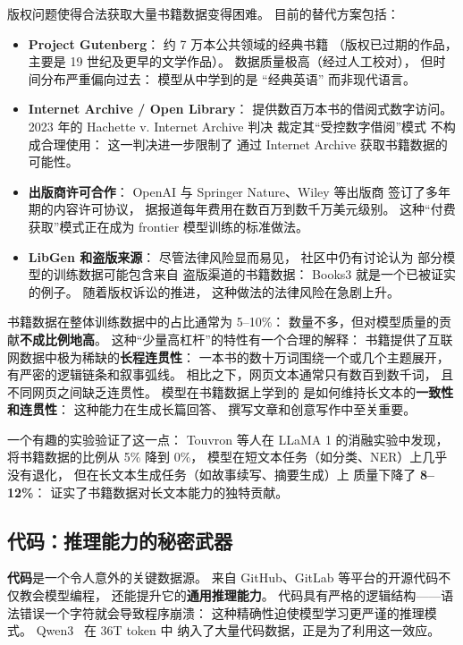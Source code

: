 版权问题使得合法获取大量书籍数据变得困难。
目前的替代方案包括：

\begin{itemize}[noitemsep]
  \item \textbf{Project Gutenberg}：
        约 7 万本公共领域的经典书籍
        （版权已过期的作品，主要是 19 世纪及更早的文学作品）。
        数据质量极高（经过人工校对），
        但时间分布严重偏向过去：
        模型从中学到的是 “经典英语” 而非现代语言。
  \item \textbf{Internet Archive / Open Library}：
        提供数百万本书的借阅式数字访问。
        2023 年的 Hachette v. Internet Archive 判决
        裁定其“受控数字借阅”模式
        不构成合理使用：
        这一判决进一步限制了
        通过 Internet Archive 获取书籍数据的可能性。
  \item \textbf{出版商许可合作}：
        OpenAI 与 Springer Nature、Wiley 等出版商
        签订了多年期的内容许可协议，
        据报道每年费用在数百万到数千万美元级别。
        这种“付费获取”模式正在成为
        frontier 模型训练的标准做法。
  \item \textbf{LibGen 和盗版来源}：
        尽管法律风险显而易见，
        社区中仍有讨论认为
        部分模型的训练数据可能包含来自
        盗版渠道的书籍数据：
        Books3 就是一个已被证实的例子。
        随着版权诉讼的推进，
        这种做法的法律风险在急剧上升。
\end{itemize}

书籍数据在整体训练数据中的占比通常为 5--10\%：
数量不多，但对模型质量的贡献\textbf{不成比例地高}。
这种“少量高杠杆”的特性有一个合理的解释：
书籍提供了互联网数据中极为稀缺的\textbf{长程连贯性}：
一本书的数十万词围绕一个或几个主题展开，
有严密的逻辑链条和叙事弧线。
相比之下，网页文本通常只有数百到数千词，
且不同网页之间缺乏连贯性。
模型在书籍数据上学到的
是如何维持长文本的\textbf{一致性和连贯性}：
这种能力在生成长篇回答、
撰写文章和创意写作中至关重要。

一个有趣的实验验证了这一点：
Touvron 等人在 LLaMA 1 的消融实验中发现，
将书籍数据的比例从 5\% 降到 0\%，
模型在短文本任务（如分类、NER）上几乎没有退化，
但在长文本生成任务（如故事续写、摘要生成）上
质量下降了 \textbf{8--12\%}：
证实了书籍数据对长文本能力的独特贡献。

\subsection{代码：推理能力的秘密武器}

\textbf{代码}是一个令人意外的关键数据源。
来自 GitHub、GitLab 等平台的开源代码不仅教会模型编程，
还能提升它的\textbf{通用推理能力}。
代码具有严格的逻辑结构——语法错误一个字符就会导致程序崩溃：
这种精确性迫使模型学习更严谨的推理模式。
Qwen3~\cite{qwen2025qwen3} 在 36T token 中
纳入了大量代码数据，正是为了利用这一效应。

